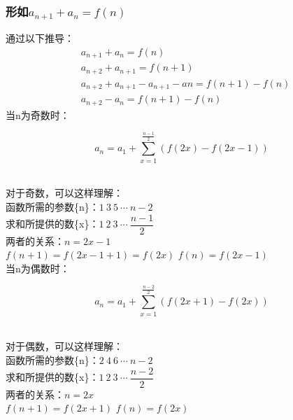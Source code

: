 \documentclass[UTF8]{ctexart}
\begin{document}
\newpage

\subsubsection{形如{\large$a_{n+1}+a_{n}=f(n)$}}
    通过以下推导：
    \setcounter{equation}{0}
    \begin{align}
        &a_{n+1}+a_{n}=f(n)\\[3mm]
        &a_{n+2}+a_{n+1}=f(n+1)\\[5mm]
        &a_{n+2}+a_{n+1}-a_{n+1}-an=f(n+1)-f(n)\\[3mm]
        &a_{n+2}-a_{n}=f(n+1)-f(n)
    \end{align}
    当n为奇数时：
    \begin{large}
    \begin{equation*}
        a_n=a_1+\sum_{x=1}^{\frac{n-1}{2}}\left(f(2x)-f(2x-1)\right)
    \end{equation*}
    \end{large}\\
    对于奇数，可以这样理解：\\[3mm]
    函数所需的参数\{n\}：$1~3~5~\cdots~n-2$\\[3mm]
    求和所提供的数\{x\}：$1~2~3~\cdots~\dfrac{n-1}{2}$\\[3mm]
    两者的关系：$n=2x-1$\\[3mm]
    $f(n+1)=f(2x-1+1)=f(2x)$\qquad
    $f(n)=f(2x-1)$\\[6mm]
    当n为偶数时：
    \begin{large}
    \begin{equation*}
        a_n=a_1+\sum_{x=1}^{\frac{n-2}{2}}\left(f(2x+1)-f(2x)\right)
    \end{equation*}
    \end{large}\\
    对于偶数，可以这样理解：\\[3mm]
    函数所需的参数\{n\}：$2~4~6~\cdots~n-2$\\[3mm]
    求和所提供的数\{x\}：$1~2~3~\cdots~\dfrac{n-2}{2}$\\[3mm]
    两者的关系：$n=2x$\\[3mm]
    $f(n+1)=f(2x+1)$\qquad
    $f(n)=f(2x)$
    
\newpage
\end{document}

